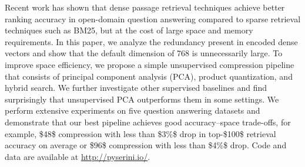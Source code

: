 Recent work has shown that dense passage retrieval techniques achieve better ranking accuracy in open-domain question answering compared to sparse retrieval techniques such as BM25, but at the cost of large space and memory requirements. In this paper, we analyze the redundancy present in encoded dense vectors and show that the default dimension of 768 is unnecessarily large. To improve space efficiency, we propose a simple unsupervised compression pipeline that consists of principal component analysis (PCA), product quantization, and hybrid search. We further investigate other supervised baselines and find surprisingly that unsupervised PCA outperforms them in some settings. We perform extensive experiments on five question answering datasets and demonstrate that our best pipeline achieves good accuracy--space trade-offs, for example, \$48\times\$ compression with less than \$3\%\$ drop in top-\$100\$ retrieval accuracy on average or \$96\times\$ compression with less than \$4\%\$ drop. Code and data are available at \url{http://pyserini.io/}.
